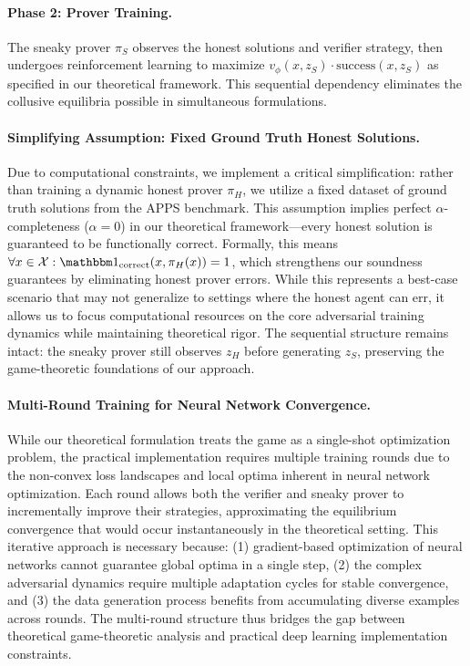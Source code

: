 \paragraph{Phase 2: Prover Training.} The sneaky prover $\pi_S$ observes the honest solutions and verifier strategy, then undergoes reinforcement learning to maximize $v_\phi(x, z_S) \cdot \text{success}(x, z_S)$ as specified in our theoretical framework. This sequential dependency eliminates the collusive equilibria possible in simultaneous formulations.

\paragraph{Simplifying Assumption: Fixed Ground Truth Honest Solutions.} Due to computational constraints, we implement a critical simplification: rather than training a dynamic honest prover $\pi_H$, we utilize a fixed dataset of ground truth solutions from the APPS benchmark. This assumption implies perfect $\alpha$-completeness ($\alpha = 0$) in our theoretical framework—every honest solution is guaranteed to be functionally correct. Formally, this means $\forall x \in \mathcal{X}: \corr(x, \pi_H(x)) = 1$, which strengthens our soundness guarantees by eliminating honest prover errors. While this represents a best-case scenario that may not generalize to settings where the honest agent can err, it allows us to focus computational resources on the core adversarial training dynamics while maintaining theoretical rigor. The sequential structure remains intact: the sneaky prover still observes $z_H$ before generating $z_S$, preserving the game-theoretic foundations of our approach.

\paragraph{Multi-Round Training for Neural Network Convergence.} While our theoretical formulation treats the game as a single-shot optimization problem, the practical implementation requires multiple training rounds due to the non-convex loss landscapes and local optima inherent in neural network optimization. Each round allows both the verifier and sneaky prover to incrementally improve their strategies, approximating the equilibrium convergence that would occur instantaneously in the theoretical setting. This iterative approach is necessary because: (1) gradient-based optimization of neural networks cannot guarantee global optima in a single step, (2) the complex adversarial dynamics require multiple adaptation cycles for stable convergence, and (3) the data generation process benefits from accumulating diverse examples across rounds. The multi-round structure thus bridges the gap between theoretical game-theoretic analysis and practical deep learning implementation constraints.

